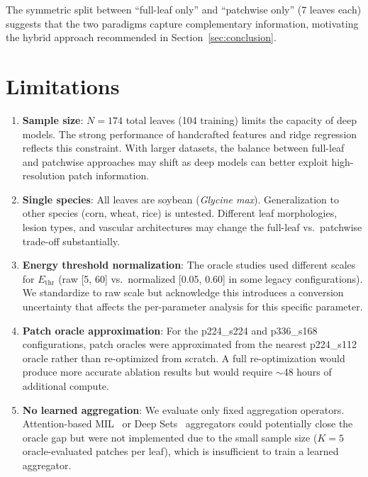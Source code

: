 \documentclass[11pt,a4paper]{article}
\begin{document}
The symmetric split between ``full-leaf only'' and ``patchwise only'' (7 leaves each) suggests that the two paradigms capture complementary information, motivating the hybrid approach recommended in Section~\ref{sec:conclusion}.


\section{Limitations}
\label{sec:limitations}

\begin{enumerate}
    \item \textbf{Sample size}: $N = 174$ total leaves (104 training) limits the capacity of deep models. The strong performance of handcrafted features and ridge regression reflects this constraint. With larger datasets, the balance between full-leaf and patchwise approaches may shift as deep models can better exploit high-resolution patch information.

    \item \textbf{Single species}: All leaves are soybean (\emph{Glycine max}). Generalization to other species (corn, wheat, rice) is untested. Different leaf morphologies, lesion types, and vascular architectures may change the full-leaf vs.\ patchwise trade-off substantially.

    \item \textbf{Energy threshold normalization}: The oracle studies used different scales for $E_\mathrm{thr}$ (raw [5, 60] vs.\ normalized [0.05, 0.60] in some legacy configurations). We standardize to raw scale but acknowledge this introduces a conversion uncertainty that affects the per-parameter analysis for this specific parameter.

    \item \textbf{Patch oracle approximation}: For the p224\_s224 and p336\_s168 configurations, patch oracles were approximated from the nearest p224\_s112 oracle rather than re-optimized from scratch. A full re-optimization would produce more accurate ablation results but would require $\sim$48 hours of additional compute.

    \item \textbf{No learned aggregation}: We evaluate only fixed aggregation operators. Attention-based MIL~\citep{ilse2018attention} or Deep Sets~\citep{zaheer2017deepsets} aggregators could potentially close the oracle gap but were not implemented due to the small sample size ($K=5$ oracle-evaluated patches per leaf), which is insufficient to train a learned aggregator.


\end{enumerate}
\end{document}

